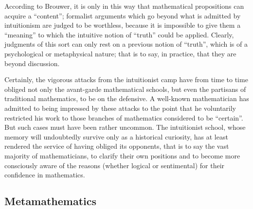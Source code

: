 According to Brouwer, it is only in this way that mathematical propositions can acquire a ``content''; formalist arguments which go beyond what is admitted by intuitionism are judged to be worthless, because it is impossible to give them a ``meaning'' to which the intuitive notion of ``truth'' could be applied. Clearly, judgments of this sort can only rest on a previous notion of ``truth'', which is of a psychological or metaphysical nature; that is to say, in practice, that they are beyond discussion.

Certainly, the vigorous attacks from the intuitionist camp have from time to time obliged not only the avant-garde mathematical schools, but even the partisans of traditional mathematics, to be on the defensive. A well-known mathematician has admitted to being impressed by these attacks to the point that he voluntarily restricted his work to those branches of mathematics considered to be ``certain''. But such cases must have been rather uncommon. The intuitionist school, whose memory will undoubtedly survive only as a historical curiosity, has at least rendered the service of having obliged its opponents, that is to say the vast majority of mathematicians, to clarify their own positions and to become more consciously aware of the reasons (whether logical or sentimental) for their confidence in mathematics.

\subsection*{Metamathematics}

